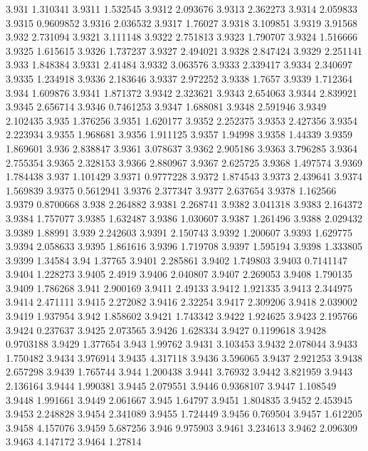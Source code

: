 3.931  1.310341
3.9311  1.532545
3.9312  2.093676
3.9313  2.362273
3.9314  2.059833
3.9315  0.9609852
3.9316  2.036532
3.9317  1.76027
3.9318  3.109851
3.9319  3.91568
3.932  2.731094
3.9321  3.111148
3.9322  2.751813
3.9323  1.790707
3.9324  1.516666
3.9325  1.615615
3.9326  1.737237
3.9327  2.494021
3.9328  2.847424
3.9329  2.251141
3.933  1.848384
3.9331  2.41484
3.9332  3.063576
3.9333  2.339417
3.9334  2.340697
3.9335  1.234918
3.9336  2.183646
3.9337  2.972252
3.9338  1.7657
3.9339  1.712364
3.934  1.609876
3.9341  1.871372
3.9342  2.323621
3.9343  2.654063
3.9344  2.839921
3.9345  2.656714
3.9346  0.7461253
3.9347  1.688081
3.9348  2.591946
3.9349  2.102435
3.935  1.376256
3.9351  1.620177
3.9352  2.252375
3.9353  2.427356
3.9354  2.223934
3.9355  1.968681
3.9356  1.911125
3.9357  1.94998
3.9358  1.44339
3.9359  1.869601
3.936  2.838847
3.9361  3.078637
3.9362  2.905186
3.9363  3.796285
3.9364  2.755354
3.9365  2.328153
3.9366  2.880967
3.9367  2.625725
3.9368  1.497574
3.9369  1.784438
3.937  1.101429
3.9371  0.9777228
3.9372  1.874543
3.9373  2.439641
3.9374  1.569839
3.9375  0.5612941
3.9376  2.377347
3.9377  2.637654
3.9378  1.162566
3.9379  0.8700668
3.938  2.264882
3.9381  2.268741
3.9382  3.041318
3.9383  2.164372
3.9384  1.757077
3.9385  1.632487
3.9386  1.030607
3.9387  1.261496
3.9388  2.029432
3.9389  1.88991
3.939  2.242603
3.9391  2.150743
3.9392  1.200607
3.9393  1.629775
3.9394  2.058633
3.9395  1.861616
3.9396  1.719708
3.9397  1.595194
3.9398  1.333805
3.9399  1.34584
3.94  1.37765
3.9401  2.285861
3.9402  1.749803
3.9403  0.7141147
3.9404  1.228273
3.9405  2.4919
3.9406  2.040807
3.9407  2.269053
3.9408  1.790135
3.9409  1.786268
3.941  2.900169
3.9411  2.49133
3.9412  1.921335
3.9413  2.344975
3.9414  2.471111
3.9415  2.272082
3.9416  2.32254
3.9417  2.309206
3.9418  2.039002
3.9419  1.937954
3.942  1.858602
3.9421  1.743342
3.9422  1.924625
3.9423  2.195766
3.9424  0.237637
3.9425  2.073565
3.9426  1.628334
3.9427  0.1199618
3.9428  0.9703188
3.9429  1.377654
3.943  1.99762
3.9431  3.103453
3.9432  2.078044
3.9433  1.750482
3.9434  3.976914
3.9435  4.317118
3.9436  3.596065
3.9437  2.921253
3.9438  2.657298
3.9439  1.765744
3.944  1.200438
3.9441  3.76932
3.9442  3.821959
3.9443  2.136164
3.9444  1.990381
3.9445  2.079551
3.9446  0.9368107
3.9447  1.108549
3.9448  1.991661
3.9449  2.061667
3.945  1.64797
3.9451  1.804835
3.9452  2.453945
3.9453  2.248828
3.9454  2.341089
3.9455  1.724449
3.9456  0.769504
3.9457  1.612205
3.9458  4.157076
3.9459  5.687256
3.946  9.975903
3.9461  3.234613
3.9462  2.096309
3.9463  4.147172
3.9464  1.27814

